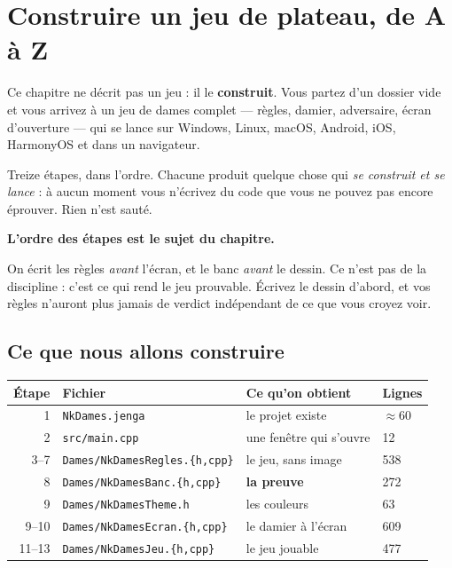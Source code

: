 \chapter{Construire un jeu de plateau, de A à Z}

Ce chapitre ne décrit pas un jeu : il le \textbf{construit}. Vous partez d'un
dossier vide et vous arrivez à un jeu de dames complet --- règles, damier,
adversaire, écran d'ouverture --- qui se lance sur Windows, Linux, macOS,
Android, iOS, HarmonyOS et dans un navigateur.

Treize étapes, dans l'ordre. Chacune produit quelque chose qui \emph{se
construit et se lance} : à aucun moment vous n'écrivez du code que vous ne
pouvez pas encore éprouver. Rien n'est sauté.

\begin{nkretenir}
\textbf{L'ordre des étapes est le sujet du chapitre.}

On écrit les règles \emph{avant} l'écran, et le banc \emph{avant} le dessin.
Ce n'est pas de la discipline : c'est ce qui rend le jeu prouvable. Écrivez le
dessin d'abord, et vos règles n'auront plus jamais de verdict indépendant de ce
que vous croyez voir.
\end{nkretenir}

\section*{Ce que nous allons construire}

\begin{center}
\begin{tabular}{@{}rlll@{}}
\toprule
\textbf{Étape} & \textbf{Fichier} & \textbf{Ce qu'on obtient} & \textbf{Lignes} \\
\midrule
1 & \texttt{NkDames.jenga} & le projet existe & $\approx$60 \\
2 & \texttt{src/main.cpp} & une fenêtre qui s'ouvre & 12 \\
3--7 & \texttt{Dames/NkDamesRegles.\{h,cpp\}} & le jeu, sans image & 538 \\
8 & \texttt{Dames/NkDamesBanc.\{h,cpp\}} & \textbf{la preuve} & 272 \\
9 & \texttt{Dames/NkDamesTheme.h} & les couleurs & 63 \\
9--10 & \texttt{Dames/NkDamesEcran.\{h,cpp\}} & le damier à l'écran & 609 \\
11--13 & \texttt{Dames/NkDamesJeu.\{h,cpp\}} & le jeu jouable & 477 \\
\bottomrule
\end{tabular}
\end{center}

